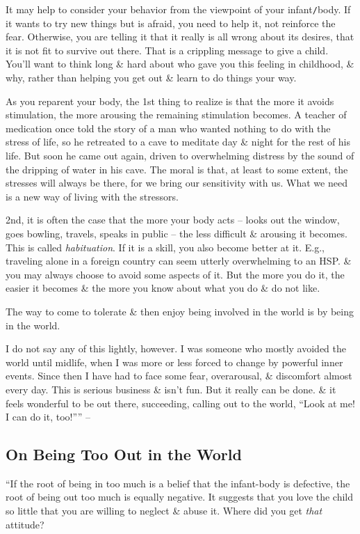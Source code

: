 \documentclass{article}
\numberwithin{equation}{section}
\begin{document}
It may help to consider your behavior from the viewpoint of your infant{\tt/}body. If it wants to try new things but is afraid, you need to help it, not reinforce the fear. Otherwise, you are telling it that it really is all wrong about its desires, that it is not fit to survive out there. That is a crippling message to give a child. You'll want to think long \& hard about who gave you this feeling in childhood, \& why, rather than helping you get out \& learn to do things your way.

As you reparent your body, the 1st thing to realize is that the more it avoids stimulation, the more arousing the remaining stimulation becomes. A teacher of medication once told the story of a man who wanted nothing to do with the stress of life, so he retreated to a cave to meditate day \& night for the rest of his life. But soon he came out again, driven to overwhelming distress by the sound of the dripping of water in his cave. The moral is that, at least to some extent, the stresses will always be there, for we bring our sensitivity with us. What we need is a new way of living with the stressors.

2nd, it is often the case that the more your body acts -- looks out the window, goes bowling, travels, speaks in public -- the less difficult \& arousing it becomes. This is called \textit{habituation}. If it is a skill, you also become better at it. E.g., traveling alone in a foreign country can seem utterly overwhelming to an HSP. \& you may always choose to avoid some aspects of it. But the more you do it, the easier it becomes \& the more you know about what you do \& do not like.

The way to come to tolerate \& then enjoy being involved in the world is by being in the world.

I do not say any of this lightly, however. I was someone who mostly avoided the world until midlife, when I was more or less forced to change by powerful inner events. Since then I have had to face some fear, overarousal, \& discomfort almost every day. This is serious business \& isn't fun. But it really can be done. \& it feels wonderful to be out there, succeeding, calling out to the world, ``Look at me! I can do it, too!'''' -- \cite[pp. 83--85]{Aron2013}

\subsection{On Being Too Out in the World}
``If the root of being in too much is a belief that the infant-body is defective, the root of being out too much is equally negative. It suggests that you love the child so little that you are willing to neglect \& abuse it. Where did you get \textit{that} attitude?
\end{document}
